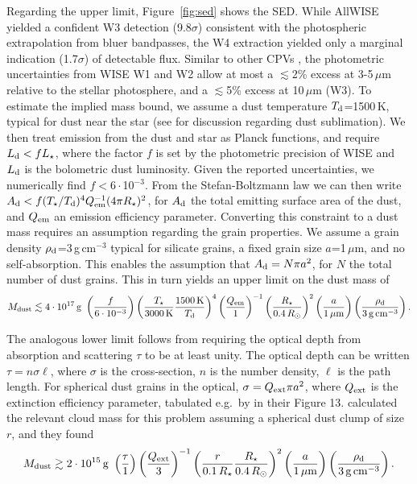 \documentclass[11pt,twocolumn,tighten]{aastex7}
\begin{document}
Regarding the upper limit, Figure~\ref{fig:sed} shows
the SED.  While AllWISE \citep{Cutri2014} yielded a confident W3
detection (9.8$\sigma$) consistent with the photospheric extrapolation
from bluer bandpasses, the W4 extraction yielded only a marginal
indication (1.7$\sigma$) of detectable flux.  Similar to other CPVs
\citep{Stauffer2017,Bouma2024}, the photometric uncertainties from WISE
W1 and W2 allow at most a $\lesssim$2\% excess at 3-5\,$\mu$m relative
to the stellar photosphere, and a $\lesssim$5\% excess at 10\,$\mu$m
(W3).  To estimate the implied mass bound, we assume a dust
temperature $T_{\rm d}$=1500\,K, typical for dust near the star (see
\citealt{Zhan2019} for discussion regarding dust sublimation).  We then
treat emission from the dust and star as Planck functions, and require
$L_{\rm d} < f L_\star$, where the factor $f$ is set by the
photometric precision of WISE and $L_{\rm d}$ is the bolometric dust
luminosity.  Given the reported uncertainties, we numerically find
$f<6\cdot$10$^{-3}$.  From the Stefan-Boltzmann law we can then write
$A_{\rm d} < f (T_\star / T_{\rm d})^4 Q_{\rm em}^{-1} (4\pi
R_\star)^2$, for $A_{\rm d}$ the total emitting surface area of the
dust, and $Q_{\rm em}$ an emission efficiency parameter.  Converting
this constraint to a dust mass requires an assumption regarding the
grain properties.  We assume a grain density $\rho_{\rm
d}$=3\,g\,cm$^{-3}$ typical for silicate grains, a fixed grain size
$a$=1\,$\mu$m, and no self-absorption.  This enables the assumption
that $A_{\rm d} = N \pi a^2$, for $N$ the total number of dust grains.
This in turn yields an upper limit on the dust mass of
\begin{equation}
  M_{\rm dust} \lesssim 4 \cdot 10^{17}\, {\rm g}\ 
  \left( \frac{f}{6\cdot10^{-3}} \right)
  \left( \frac{T_\star}{3000\,{\rm K}} \frac{1500\,{\rm K}}{T_{\rm d}} \right)^4
  \left( \frac{Q_{\rm em}}{1} \right)^{-1}
  \left( \frac{R_\star}{0.4\,R_\odot} \right)^2
  \left( \frac{a}{1\,\mathrm{\mu m}} \right)
  \left( \frac{\rho_{\rm d}}{3\,\mathrm{g\,cm^{-3}}} \right).
\end{equation}

The analogous lower limit follows from requiring the optical depth
from absorption and scattering $\tau$ to be at least unity.  The
optical depth can be written $\tau = n \sigma \ell$, where $\sigma$ is
the cross-section, $n$ is the number density, $\ell$ is the path
length.  For spherical dust grains in the optical, $\sigma = Q_{\rm
ext} \pi a^2$, where $Q_{\rm ext}$ is the extinction efficiency
parameter, tabulated e.g.~by \citet{Croll2014} in their Figure 13.
\citet{Sanderson2023} calculated the relevant cloud mass for this
problem assuming a spherical dust clump of size $r$, and they found
\begin{equation}
  M_{\rm dust} \gtrsim 2 \cdot 10^{15}\, {\rm g}\ 
  \left( \frac{\tau}{1} \right)
  \left( \frac{Q_{\rm ext}}{3} \right)^{-1}
  \left( \frac{r}{0.1\,R_\star} \frac{R_\star}{0.4\,R_\odot} \right)^2
  \left( \frac{a}{1\,\mathrm{\mu m}} \right)
  \left( \frac{\rho_{\rm d}}{3\,\mathrm{g\,cm^{-3}}} \right).
\end{equation}
\end{document}
